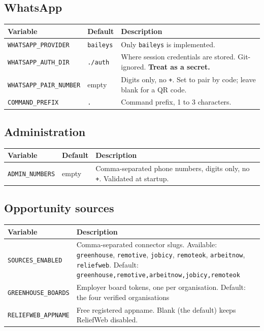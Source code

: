 \documentclass[11pt,a4paper]{report}
\begin{document}
\subsection*{WhatsApp}

\begin{center}
\begin{tabularx}{\textwidth}{@{}llX@{}}
\toprule
\textbf{Variable} & \textbf{Default} & \textbf{Description} \\
\midrule
\texttt{WHATSAPP\_PROVIDER} & \texttt{baileys} & Only \texttt{baileys} is
implemented. \\
\texttt{WHATSAPP\_AUTH\_DIR} & \texttt{./auth} & Where session credentials are
stored. Git-ignored. \textbf{Treat as a secret.} \\
\texttt{WHATSAPP\_PAIR\_NUMBER} & empty & Digits only, no \texttt{+}. Set to
pair by code; leave blank for a QR code. \\
\texttt{COMMAND\_PREFIX} & \texttt{.} & Command prefix, 1 to 3 characters. \\
\bottomrule
\end{tabularx}
\end{center}

\subsection*{Administration}

\begin{center}
\begin{tabularx}{\textwidth}{@{}llX@{}}
\toprule
\textbf{Variable} & \textbf{Default} & \textbf{Description} \\
\midrule
\texttt{ADMIN\_NUMBERS} & empty & Comma-separated phone numbers, digits only,
no \texttt{+}. Validated at startup. \\
\bottomrule
\end{tabularx}
\end{center}

\subsection*{Opportunity sources}

\begin{center}
\begin{tabularx}{\textwidth}{@{}lX@{}}
\toprule
\textbf{Variable} & \textbf{Description} \\
\midrule
\texttt{SOURCES\_ENABLED} & Comma-separated connector slugs. Available:
\texttt{greenhouse}, \texttt{remotive}, \texttt{jobicy}, \texttt{remoteok},
\texttt{arbeitnow}, \texttt{reliefweb}. \newline
Default: \texttt{greenhouse,remotive,arbeitnow,jobicy,remoteok} \\
\addlinespace[3pt]
\texttt{GREENHOUSE\_BOARDS} & Employer board tokens, one per organisation.
\newline
Default: the four verified organisations \\
\addlinespace[3pt]
\texttt{RELIEFWEB\_APPNAME} & Free registered appname. Blank (the default)
keeps ReliefWeb disabled. \\
\bottomrule
\end{tabularx}
\end{center}
\end{document}

